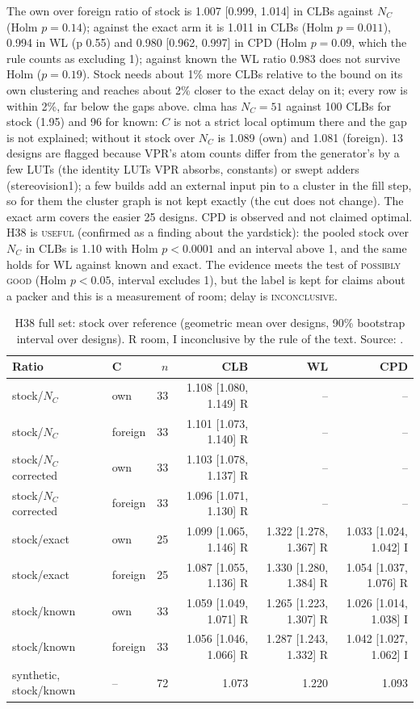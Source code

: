  The own over foreign ratio of stock is 1.007 [0.999, 1.014] in CLBs against $N_C$ (Holm $p=0.14$); against the exact arm it is 1.011 in CLBs (Holm $p=0.011$), 0.994 in WL (p 0.55) and 0.980 [0.962, 0.997] in CPD (Holm $p=0.09$, which the rule counts as excluding 1); against known the WL ratio 0.983 does not survive Holm ($p=0.19$). Stock needs about 1\% more CLBs relative to the bound on its own clustering and reaches about 2\% closer to the exact delay on it; every row is within 2\%, far below the gaps above.
 clma has $N_C=51$ against 100 CLBs for stock (1.95) and 96 for known: $C$ is not a strict local optimum there and the gap is not explained; without it stock over $N_C$ is 1.089 (own) and 1.081 (foreign). 13 designs are flagged because VPR's atom counts differ from the generator's by a few LUTs (the identity LUTs VPR absorbs, constants) or swept adders (stereovision1); a few builds add an external input pin to a cluster in the fill step, so for them the cluster graph is not kept exactly (the cut does not change). The exact arm covers the easier 25 designs. CPD is observed and not claimed optimal.
 H38 is \textsc{useful} (confirmed as a finding about the yardstick): the pooled stock over $N_C$ in CLBs is 1.10 with Holm $p<0.0001$ and an interval above 1, and the same holds for WL against known and exact. The evidence meets the test of \textsc{possibly good} (Holm $p<0.05$, interval excludes 1), but the label is kept for claims about a packer and this is a measurement of room; delay is \textsc{inconclusive}.

\begin{table}[t]
\caption{H38 full set: stock over reference (geometric mean over designs, 90\% bootstrap interval over designs). R room, I inconclusive by the rule of the text. Source: .}
\label{tab:r9full}
\centering
\footnotesize\setlength{\tabcolsep}{3pt}
\begin{tabular}{@{}llrrrr@{}}
\toprule
Ratio & C & $n$ & CLB & WL & CPD \\
\midrule
stock/$N_C$ & own & 33 & 1.108 [1.080, 1.149] R & -- & -- \\
stock/$N_C$ & foreign & 33 & 1.101 [1.073, 1.140] R & -- & -- \\
stock/$N_C$ corrected & own & 33 & 1.103 [1.078, 1.137] R & -- & -- \\
stock/$N_C$ corrected & foreign & 33 & 1.096 [1.071, 1.130] R & -- & -- \\
stock/exact & own & 25 & 1.099 [1.065, 1.146] R & 1.322 [1.278, 1.367] R & 1.033 [1.024, 1.042] I \\
stock/exact & foreign & 25 & 1.087 [1.055, 1.136] R & 1.330 [1.280, 1.384] R & 1.054 [1.037, 1.076] R \\
stock/known & own & 33 & 1.059 [1.049, 1.071] R & 1.265 [1.223, 1.307] R & 1.026 [1.014, 1.038] I \\
stock/known & foreign & 33 & 1.056 [1.046, 1.066] R & 1.287 [1.243, 1.332] R & 1.042 [1.027, 1.062] I \\
synthetic, stock/known & -- & 72 & 1.073 & 1.220 & 1.093 \\
\bottomrule
\end{tabular}
\end{table}

